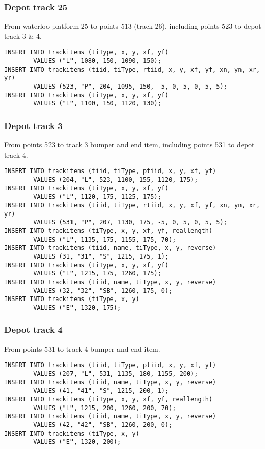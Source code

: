 \documentclass[12pt,a4paper]{article}
\begin{document}
\subsubsection{Depot track 25}
From waterloo platform 25 to points 513 (track 26), including points 523 to depot track 3 \& 4.
\begin{verbatim}
INSERT INTO trackitems (tiType, x, y, xf, yf)
        VALUES ("L", 1080, 150, 1090, 150);
INSERT INTO trackitems (tiid, tiType, rtiid, x, y, xf, yf, xn, yn, xr, yr) 
        VALUES (523, "P", 204, 1095, 150, -5, 0, 5, 0, 5, 5);
INSERT INTO trackitems (tiType, x, y, xf, yf)
        VALUES ("L", 1100, 150, 1120, 130);
\end{verbatim}

\subsubsection{Depot track 3}
From points 523 to track 3 bumper and end item, including points 531 to depot track 4.
\begin{verbatim}
INSERT INTO trackitems (tiid, tiType, ptiid, x, y, xf, yf)
        VALUES (204, "L", 523, 1100, 155, 1120, 175);
INSERT INTO trackitems (tiType, x, y, xf, yf)
        VALUES ("L", 1120, 175, 1125, 175);
INSERT INTO trackitems (tiid, tiType, rtiid, x, y, xf, yf, xn, yn, xr, yr) 
        VALUES (531, "P", 207, 1130, 175, -5, 0, 5, 0, 5, 5);
INSERT INTO trackitems (tiType, x, y, xf, yf, reallength)
        VALUES ("L", 1135, 175, 1155, 175, 70);
INSERT INTO trackitems (tiid, name, tiType, x, y, reverse)
        VALUES (31, "31", "S", 1215, 175, 1);
INSERT INTO trackitems (tiType, x, y, xf, yf)
        VALUES ("L", 1215, 175, 1260, 175);
INSERT INTO trackitems (tiid, name, tiType, x, y, reverse)
        VALUES (32, "32", "SB", 1260, 175, 0);
INSERT INTO trackitems (tiType, x, y)
        VALUES ("E", 1320, 175);
\end{verbatim}

\subsubsection{Depot track 4}
From points 531 to track 4 bumper and end item.
\begin{verbatim}
INSERT INTO trackitems (tiid, tiType, ptiid, x, y, xf, yf)
        VALUES (207, "L", 531, 1135, 180, 1155, 200);
INSERT INTO trackitems (tiid, name, tiType, x, y, reverse)
        VALUES (41, "41", "S", 1215, 200, 1);
INSERT INTO trackitems (tiType, x, y, xf, yf, reallength)
        VALUES ("L", 1215, 200, 1260, 200, 70);
INSERT INTO trackitems (tiid, name, tiType, x, y, reverse)
        VALUES (42, "42", "SB", 1260, 200, 0);
INSERT INTO trackitems (tiType, x, y)
        VALUES ("E", 1320, 200);
\end{verbatim}
\end{document}

